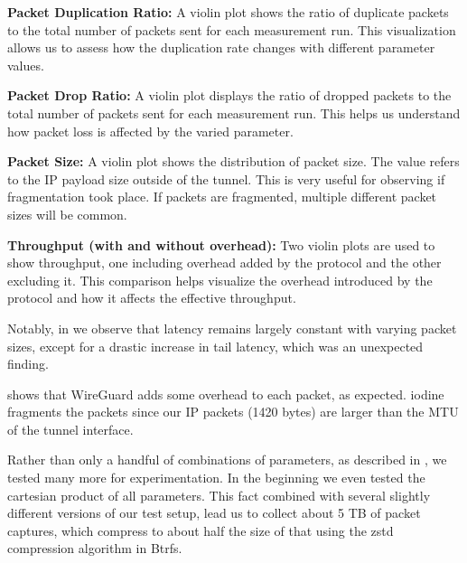 \noindent\textbf{Packet Duplication Ratio:} A violin plot shows the ratio of duplicate packets to the total number of packets sent for each measurement run.
This visualization allows us to assess how the duplication rate changes with different parameter values.

\noindent\textbf{Packet Drop Ratio:} A violin plot displays the ratio of dropped packets to the total number of packets sent for each measurement run.
This helps us understand how packet loss is affected by the varied parameter.

\noindent\textbf{Packet Size:} A violin plot shows the distribution of packet size.
The value refers to the IP payload size outside of the tunnel.
This is very useful for observing if fragmentation took place.
If packets are fragmented, multiple different packet sizes will be common.

\noindent\textbf{Throughput (with and without overhead):} Two violin plots are used to show throughput, one including overhead added by the protocol and the other excluding it.
This comparison helps visualize the overhead introduced by the protocol and how it affects the effective throughput.

Notably, in  we observe that latency remains largely constant with varying packet sizes, except for a drastic increase in tail latency, which was an unexpected finding.

 shows that WireGuard adds some overhead to each packet, as expected.
iodine fragments the packets since our IP packets (1420 bytes) are larger than the MTU of the tunnel interface.





Rather than only a handful of combinations of parameters, as described in , we tested many more for experimentation.
In the beginning we even tested the cartesian product of all parameters.
This fact combined with several slightly different versions of our test setup, lead us to collect about 5 TB of packet captures, which compress to about half the size of that using the zstd compression algorithm in Btrfs.


